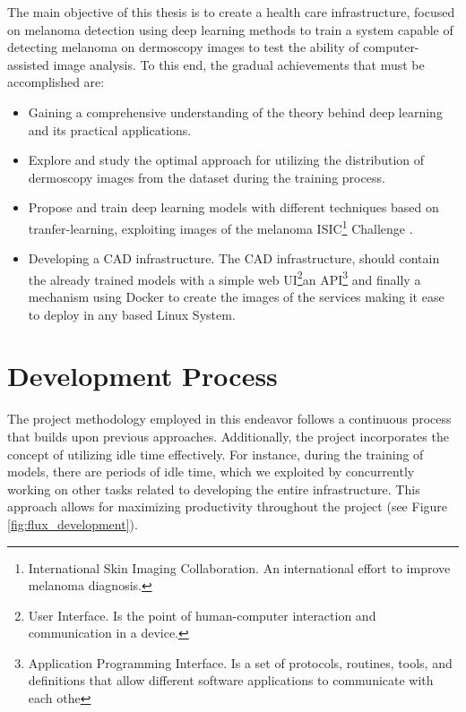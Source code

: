 The main objective of this thesis is to create a health care infrastructure,
focused on melanoma detection using deep learning methods to train a system
capable of detecting melanoma on dermoscopy images to test the ability of
computer-assisted image analysis. To this end, the gradual achievements that
must be accomplished are:

\begin{itemize}

  \item Gaining a comprehensive understanding of the theory
    behind deep learning and its practical applications.

  \item Explore and study the optimal approach for utilizing the distribution
    of dermoscopy images from the dataset during the training process.

  \item Propose and train deep learning models with different techniques based on
    tranfer-learning, exploiting images of the melanoma
    ISIC\footnote{International Skin Imaging Collaboration. An international
    effort to improve melanoma diagnosis.} Challenge \cite{IsicChallenge}.

  \item Developing a CAD infrastructure. The CAD infrastructure, should contain
    the already trained models with a simple web UI\footnote{User Interface. Is
    the point of human-computer interaction and communication in a device.}an
    API\footnote{Application Programming Interface. Is a set of protocols,
      routines, tools, and definitions that allow different software applications
    to communicate with each othe} and finally a mechanism using Docker to create
    the images of the services making it ease to deploy in any based Linux System.

\end{itemize}


\section{Development Process}

The project methodology employed in this endeavor follows a continuous process
that builds upon previous approaches. Additionally, the project incorporates
the concept of utilizing idle time effectively. For instance, during the
training of models, there are periods of idle time, which we exploited by
concurrently working on other tasks related to developing the entire
infrastructure. This approach allows for maximizing productivity throughout the
project (see Figure \ref{fig:flux_development}).

